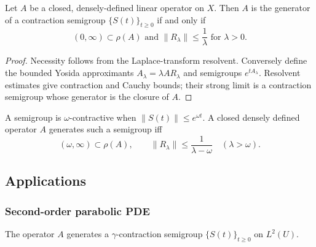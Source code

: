 \begin{theorem}
\label{thm:hille-yosida-theorem}

Let $A$ be a closed, densely-defined linear operator on $X$. Then $A$ is the generator of a contraction semigroup $\{S(t)\}_{t \geq 0}$ if and only if
\[
(0,\infty) \subset \rho(A) \text{ and } \|R_\lambda\| \leq \frac{1}{\lambda} \text{ for } \lambda > 0.
\tag{17}
\]
\end{theorem}

\begin{proof}
\sketch Necessity follows from the Laplace-transform resolvent. Conversely define the bounded Yosida approximants $A_\lambda=\lambda AR_\lambda$ and semigroups $e^{tA_\lambda}$. Resolvent estimates give contraction and Cauchy bounds; their strong limit is a contraction semigroup whose generator is the closure of $A$.
\end{proof}

\begin{remark}
\label{rem:omega-contractive-semigroup}

A semigroup is $\omega$-contractive when $\|S(t)\|\le e^{\omega t}$. A closed densely defined operator $A$ generates such a semigroup iff
\[
(\omega,\infty)\subset\rho(A),\qquad
\|R_\lambda\|\le\frac1{\lambda-\omega}\quad(\lambda>\omega).
\tag{23}
\]
\end{remark}

\subsection{Applications}

\subsubsection{Second-order parabolic PDE}

\begin{theorem}
\label{thm:parabolic-pde-as-semigroup}

The operator $A$ generates a $\gamma$-contraction semigroup $\{S(t)\}_{t \ge 0}$ on $L^2(U)$.
\end{theorem}

